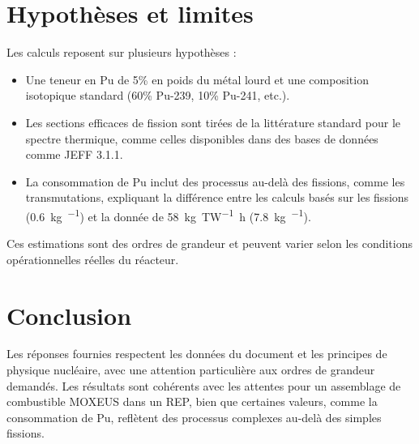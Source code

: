 \documentclass[12pt,a4paper]{article}
\begin{document}
\section*{Hypothèses et limites}
Les calculs reposent sur plusieurs hypothèses :
\begin{itemize}
  \item Une teneur en Pu de 5\% en poids du métal lourd et une composition isotopique standard (60\% Pu-239, 10\% Pu-241, etc.).
  \item Les sections efficaces de fission sont tirées de la littérature standard pour le spectre thermique, comme celles disponibles dans des bases de données comme JEFF 3.1.1.
  \item La consommation de Pu inclut des processus au-delà des fissions, comme les transmutations, expliquant la différence entre les calculs basés sur les fissions (\SI{0,6}{\kilogram\per\year}) et la donnée de \SI{58}{\kilogram\per\tera\watt\hour} (\SI{7,8}{\kilogram\per\year}).
\end{itemize}
Ces estimations sont des ordres de grandeur et peuvent varier selon les conditions opérationnelles réelles du réacteur.

\section*{Conclusion}
Les réponses fournies respectent les données du document et les principes de physique nucléaire, avec une attention particulière aux ordres de grandeur demandés. Les résultats sont cohérents avec les attentes pour un assemblage de combustible MOXEUS dans un REP, bien que certaines valeurs, comme la consommation de Pu, reflètent des processus complexes au-delà des simples fissions.
\end{document}
